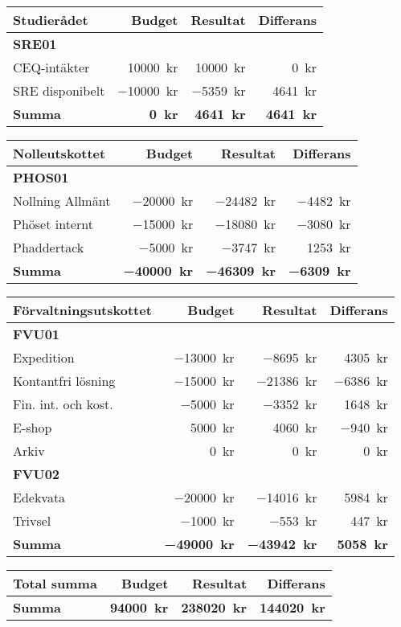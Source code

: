 \documentclass[../_main/handlingar.tex]{subfiles}
\begin{document}
\begin{tabularx}{12cm}{X r r r}
    \textbf{\large Studierådet} & \textbf{Budget} & \textbf{Resultat} & \textbf{Differans} \\
    \hline
    \textbf{SRE01} \\
    CEQ-intäkter & \SI{10000}{kr} & \SI{10000}{kr} & \SI{0}{kr} \\
    SRE disponibelt & \SI{-10000}{kr} & \SI{-5359}{kr} & \SI{4641}{kr} \\
    \hline
    \textbf{Summa} & \textbf{\SI{0}{kr}} & \textbf{\SI{4641}{kr}} & \textbf{\SI{4641}{kr}} \\
\end{tabularx}

\begin{tabularx}{12cm}{X r r r}
    \textbf{\large Nolleutskottet} & \textbf{Budget} & \textbf{Resultat} & \textbf{Differans} \\
    \hline
    \textbf{PHOS01} \\
    Nollning Allmänt & \SI{-20000}{kr} & \SI{-24482}{kr} & \SI{-4482}{kr} \\
    Phöset internt & \SI{-15000}{kr} & \SI{-18080}{kr} & \SI{-3080}{kr} \\
    Phaddertack & \SI{-5000}{kr} & \SI{-3747}{kr} & \SI{1253}{kr} \\
    \hline
    \textbf{Summa} & \textbf{\SI{-40000}{kr}} & \textbf{\SI{-46309}{kr}} & \textbf{\SI{-6309}{kr}} \\
\end{tabularx}

\begin{tabularx}{12cm}{X r r r}
    \textbf{\large Förvaltningsutskottet} & \textbf{Budget} & \textbf{Resultat} & \textbf{Differans} \\
    \hline
    \textbf{FVU01} \\
    Expedition & \SI{-13000}{kr} & \SI{-8695}{kr} & \SI{4305}{kr} \\
    Kontantfri lösning & \SI{-15000}{kr} & \SI{-21386}{kr} & \SI{-6386}{kr} \\
    Fin. int. och kost. & \SI{-5000}{kr} & \SI{-3352}{kr} & \SI{1648}{kr} \\
    E-shop & \SI{5000}{kr} & \SI{4060}{kr} & \SI{-940}{kr} \\
    Arkiv & \SI{0}{kr} & \SI{0}{kr} & \SI{0}{kr} \\
    \textbf{FVU02} \\
    Edekvata & \SI{-20000}{kr} & \SI{-14016}{kr} & \SI{5984}{kr} \\
    Trivsel & \SI{-1000}{kr} & \SI{-553}{kr} & \SI{447}{kr} \\
    \hline
    \textbf{Summa} & \textbf{\SI{-49000}{kr}} & \textbf{\SI{-43942}{kr}} & \textbf{\SI{5058}{kr}} \\
\end{tabularx}

\begin{tabularx}{12cm}{X r r r}
    \textbf{\large Total summa} & \textbf{Budget} & \textbf{Resultat} & \textbf{Differans} \\
    \hline
    \textbf{Summa} & \textbf{\SI{94000}{kr}} & \textbf{\SI{238020}{kr}} & \textbf{\SI{144020}{kr}} \\
\end{tabularx}

\newpage
\end{document}
